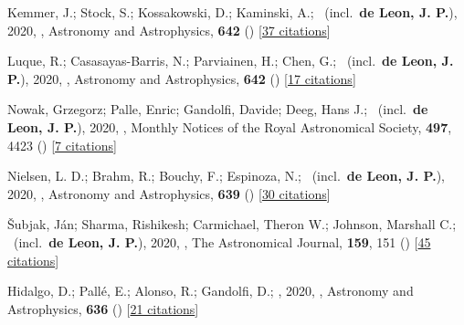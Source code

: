 \item[{\color{numcolor}\scriptsize27}] Kemmer, J.; Stock, S.; Kossakowski, D.; Kaminski, A.; \etal\ (incl.\ \textbf{de Leon, J. P.}), 2020, , Astronomy and Astrophysics, \textbf{642} () [\href{https://ui.adsabs.harvard.edu/abs/2020A&A...642A.236K}{37 citations}]

\item[{\color{numcolor}\scriptsize26}] Luque, R.; Casasayas-Barris, N.; Parviainen, H.; Chen, G.; \etal\ (incl.\ \textbf{de Leon, J. P.}), 2020, , Astronomy and Astrophysics, \textbf{642} () [\href{https://ui.adsabs.harvard.edu/abs/2020A&A...642A..50L}{17 citations}]

\item[{\color{numcolor}\scriptsize25}] Nowak, Grzegorz; Palle, Enric; Gandolfi, Davide; Deeg, Hans J.; \etal\ (incl.\ \textbf{de Leon, J. P.}), 2020, , Monthly Notices of the Royal Astronomical Society, \textbf{497}, 4423 () [\href{https://ui.adsabs.harvard.edu/abs/2020MNRAS.497.4423N}{7 citations}]

\item[{\color{numcolor}\scriptsize24}] Nielsen, L. D.; Brahm, R.; Bouchy, F.; Espinoza, N.; \etal\ (incl.\ \textbf{de Leon, J. P.}), 2020, , Astronomy and Astrophysics, \textbf{639} () [\href{https://ui.adsabs.harvard.edu/abs/2020A&A...639A..76N}{30 citations}]

\item[{\color{numcolor}\scriptsize23}] {\v{S}}ubjak, J{\'a}n; Sharma, Rishikesh; Carmichael, Theron W.; Johnson, Marshall C.; \etal\ (incl.\ \textbf{de Leon, J. P.}), 2020, , The Astronomical Journal, \textbf{159}, 151 () [\href{https://ui.adsabs.harvard.edu/abs/2020AJ....159..151S}{45 citations}]

\item[{\color{numcolor}\scriptsize22}] Hidalgo, D.; Pall{\'e}, E.; Alonso, R.; Gandolfi, D.; \etal, 2020, , Astronomy and Astrophysics, \textbf{636} () [\href{https://ui.adsabs.harvard.edu/abs/2020A&A...636A..89H}{21 citations}]

